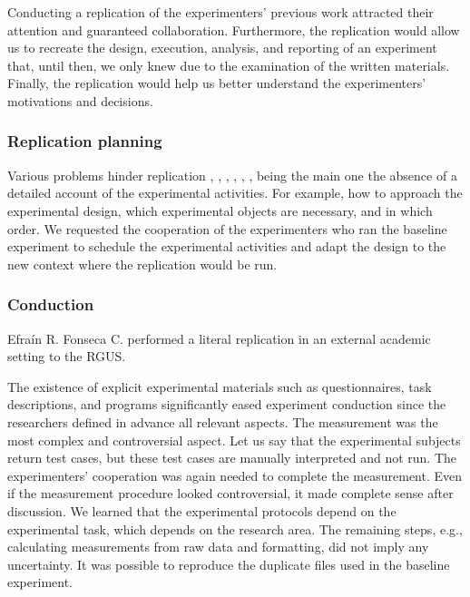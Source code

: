 Conducting a replication of the experimenters' previous work attracted their attention and guaranteed collaboration. Furthermore, the replication would allow us to recreate the design, execution, analysis, and reporting of an experiment that, until then, we only knew due to the examination of the written materials. Finally, the replication would help us better understand the experimenters' motivations and decisions.

\subsubsection{Replication planning}
Various problems hinder replication \cite{Gallardo-2012-CG-PL-SE}, \cite{Vegas-2006-communication-researchers}, \cite{Miller-2005-replicating-SE-experiments}, \cite{Gomez-2014-understanding-replication}, \cite{Demagalhaes-2015-replications-SE}, \cite{Carver-2010-guidelines-replication-SE}, being the main one the absence of a detailed account of the experimental activities. For example, how to approach the experimental design, which experimental objects are necessary, and in which order. We requested the cooperation of the experimenters who ran the baseline experiment to schedule the experimental activities and adapt the design to the new context where the replication would be run.

\subsubsection{Conduction}
Efra\'in R. Fonseca C. performed a literal replication \cite{Gomez-2014-understanding-replication} in an external academic setting to the RGUS.

The existence of explicit experimental materials such as questionnaires, task descriptions, and programs significantly eased experiment conduction since the researchers defined in advance all relevant aspects. The measurement was the most complex and controversial aspect. Let us say that the experimental subjects return test cases, but these test cases are manually interpreted and not run. The experimenters' cooperation was again needed to complete the measurement. Even if the measurement procedure looked controversial, it made complete sense after discussion. We learned that the experimental protocols depend on the experimental task, which depends on the research area. The remaining steps, e.g., calculating measurements from raw data and formatting, did not imply any uncertainty. It was possible to reproduce the duplicate files used in the baseline experiment.

